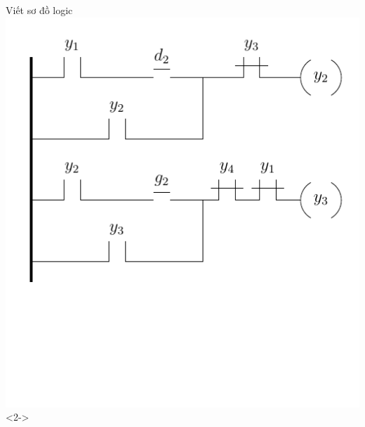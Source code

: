 \documentclass[24pt]{beamer}
\begin{document}
\begin{frame}[plain]{Viết sơ đồ logic}
	\hspace{0.5cm}\includegraphics[scale=0.6]{draw-tikz/quatrinh-bt4-buoc2-sodologic-b2.pdf}<2->
\end{frame}
\end{document}
